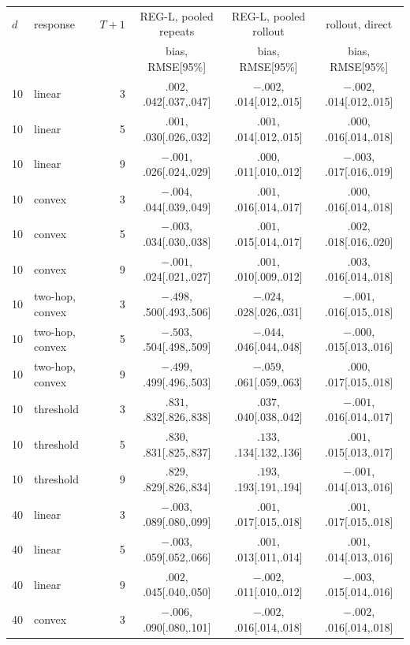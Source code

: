\footnotesize\setlength{\tabcolsep}{3pt}
\begin{tabular}{llrccc}
\toprule
$d$ & response & $T{+}1$ & REG-L, pooled repeats & REG-L, pooled rollout & rollout, direct \\
 & & & bias, RMSE[95\%] & bias, RMSE[95\%] & bias, RMSE[95\%] \\
\midrule
10 & linear & 3 & $.002$, .042[.037,.047] & $-.002$, .014[.012,.015] & $-.002$, .014[.012,.015] \\
10 & linear & 5 & $.001$, .030[.026,.032] & $.001$, .014[.012,.015] & $.000$, .016[.014,.018] \\
10 & linear & 9 & $-.001$, .026[.024,.029] & $.000$, .011[.010,.012] & $-.003$, .017[.016,.019] \\
10 & convex & 3 & $-.004$, .044[.039,.049] & $.001$, .016[.014,.017] & $.000$, .016[.014,.018] \\
10 & convex & 5 & $-.003$, .034[.030,.038] & $.001$, .015[.014,.017] & $.002$, .018[.016,.020] \\
10 & convex & 9 & $-.001$, .024[.021,.027] & $.001$, .010[.009,.012] & $.003$, .016[.014,.018] \\
10 & two-hop, convex & 3 & $-.498$, .500[.493,.506] & $-.024$, .028[.026,.031] & $-.001$, .016[.015,.018] \\
10 & two-hop, convex & 5 & $-.503$, .504[.498,.509] & $-.044$, .046[.044,.048] & $-.000$, .015[.013,.016] \\
10 & two-hop, convex & 9 & $-.499$, .499[.496,.503] & $-.059$, .061[.059,.063] & $.000$, .017[.015,.018] \\
10 & threshold & 3 & $.831$, .832[.826,.838] & $.037$, .040[.038,.042] & $-.001$, .016[.014,.017] \\
10 & threshold & 5 & $.830$, .831[.825,.837] & $.133$, .134[.132,.136] & $.001$, .015[.013,.017] \\
10 & threshold & 9 & $.829$, .829[.826,.834] & $.193$, .193[.191,.194] & $-.001$, .014[.013,.016] \\
\midrule
40 & linear & 3 & $-.003$, .089[.080,.099] & $.001$, .017[.015,.018] & $.001$, .017[.015,.018] \\
40 & linear & 5 & $-.003$, .059[.052,.066] & $.001$, .013[.011,.014] & $.001$, .014[.013,.016] \\
40 & linear & 9 & $.002$, .045[.040,.050] & $-.002$, .011[.010,.012] & $-.003$, .015[.014,.016] \\
40 & convex & 3 & $-.006$, .090[.080,.101] & $-.002$, .016[.014,.018] & $-.002$, .016[.014,.018] \\

\end{tabular}
